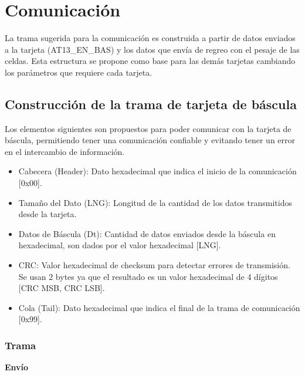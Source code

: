 \documentclass[12pt,a4paper]{article}
\begin{document}
    \section{Comunicación}
    \begin{twocolsection}
        La trama sugerida para la comunicación es construida a partir de datos enviados a la tarjeta (AT13\_EN\_BAS) y los datos que envía de regreo con el pesaje de las celdas. Esta estructura se propone como base para las demás tarjetas cambiando los parámetros que requiere cada tarjeta.

        \subsection{Construcción de la trama de tarjeta de báscula}
        Los elementos siguientes son propuestos para poder comunicar con la tarjeta de báscula, permitiendo tener una comunicación confiable y evitando tener un error en el intercambio de información.
            \begin{itemize}
              \item Cabecera (Header): Dato hexadecimal que indica el inicio de la comunicación [0x00]. 
              \item Tamaño del Dato (LNG): Longitud de la cantidad de los datos transmitidos desde la tarjeta.
              \item Datos de Báscula (Dt): Cantidad de datos enviados desde la báscula en hexadecimal, son dados por el valor hexadecimal [LNG].
              \item CRC: Valor hexadecimal de checksum para detectar errores de transmisión. Se usan 2 bytes ya que el resultado es un valor hexadecimal de 4 dígitos [CRC MSB, CRC LSB].
              \item Cola (Tail): Dato hexadecimal que indica el final de la trama de comunicación [0x99].
            \end{itemize}
    \end{twocolsection}

        \subsubsection{Trama}
            \textbf{\normalsize{Envío}}
                \begin{center}
                \end{center}
        
\end{document}
